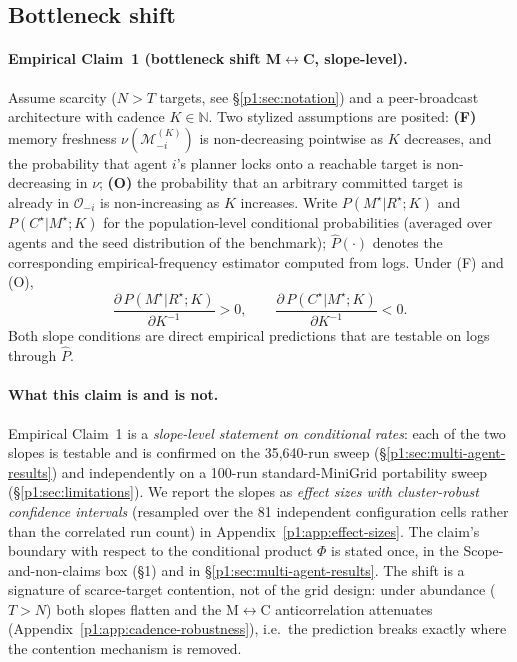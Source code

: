 \documentclass{article}
\begin{document}
\subsection{Bottleneck shift}
\label{p1:sec:shift}

\paragraph{Empirical Claim~1 (bottleneck shift M$\leftrightarrow$C, slope-level).}
Assume scarcity ($N > T$ targets, see \S\ref{p1:sec:notation}) and a
peer-broadcast architecture with cadence $K \in \mathbb{N}$. Two
stylized assumptions are posited:
\textbf{(F)} memory freshness $\nu(\mathcal{M}_{-i}^{(K)})$ is
non-decreasing pointwise as $K$ decreases, and the probability that
agent $i$'s planner locks onto a reachable target is non-decreasing in
$\nu$;
\textbf{(O)} the probability that an arbitrary committed target is
already in $\mathcal{O}_{-i}$ is non-increasing as $K$ increases.
Write $P(M^\star|R^\star;K)$ and $P(C^\star|M^\star;K)$ for the
population-level conditional probabilities (averaged over agents and
the seed distribution of the benchmark); $\hat{P}(\cdot)$ denotes the
corresponding empirical-frequency estimator computed from logs. Under
(F) and (O),
\[
\frac{\partial\, P(M^\star|R^\star;K)}{\partial K^{-1}} > 0,
\qquad
\frac{\partial\, P(C^\star|M^\star;K)}{\partial K^{-1}} < 0.
\]
Both slope conditions are direct empirical predictions that are
testable on logs through $\hat{P}$.

\paragraph{What this claim is and is not.}
Empirical Claim~1 is a \emph{slope-level statement on conditional rates}: each of the two slopes is testable and is confirmed on the 35{,}640-run sweep (\S\ref{p1:sec:multi-agent-results}) and independently on a 100-run standard-MiniGrid portability sweep (\S\ref{p1:sec:limitations}). We report the slopes as \emph{effect sizes with cluster-robust confidence intervals} (resampled over the 81 independent configuration cells rather than the correlated run count) in Appendix~\ref{p1:app:effect-sizes}. The claim's boundary with respect to the conditional product $\Phi$ is stated once, in the Scope-and-non-claims box (\S1) and in \S\ref{p1:sec:multi-agent-results}. The shift is a signature of scarce-target contention, not of the grid design: under abundance ($T{>}N$) both slopes flatten and the M$\leftrightarrow$C anticorrelation attenuates (Appendix~\ref{p1:app:cadence-robustness}), i.e.\ the prediction breaks exactly where the contention mechanism is removed.
\end{document}
